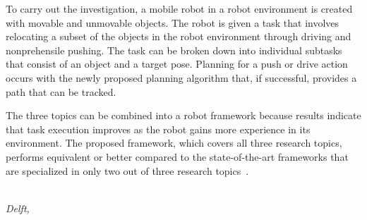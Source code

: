 To carry out the investigation, a mobile robot in a robot environment is created with movable and unmovable objects. The robot is given a task that involves relocating a subset of the objects in the robot environment through driving and nonprehensile pushing. The task can be broken down into individual subtasks that consist of an object and a target pose. Planning for a push or drive action occurs with the newly proposed planning algorithm that, if successful, provides a path that can be tracked.\bs

The three topics can be combined into a robot framework because results indicate that task execution improves as the robot gains more experience in its environment. The proposed framework, which covers all three research topics, performs equivalent or better compared to the state-of-the-art frameworks that are specialized in only two out of three research topics~\cite{ellis_navigation_2022,sabbaghnovin_model_2021,scholz_navigation_2016,vega-brown_asymptotically_2020,wang_affordancebased_2020}.\bs

\begin{flushright}
{\makeatletter\itshape
    \@author\\
    Delft, \monthname{} \the\year{}
\makeatother}
\end{flushright}

